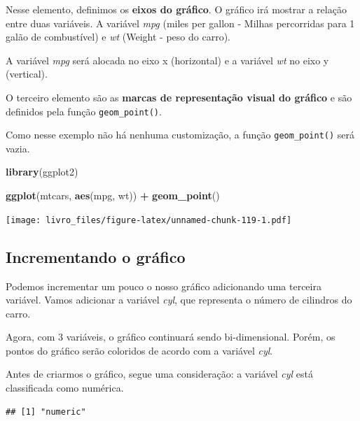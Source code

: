 \documentclass[
]{book}
\newenvironment{Shaded}{\begin{snugshade}}{\end{snugshade}}
\newcommand{\KeywordTok}[1]{\textcolor[rgb]{0.13,0.29,0.53}{\textbf{#1}}}
\newcommand{\NormalTok}[1]{#1}
\newcommand{\OperatorTok}[1]{\textcolor[rgb]{0.81,0.36,0.00}{\textbf{#1}}}
\newcommand{\StringTok}[1]{\textcolor[rgb]{0.31,0.60,0.02}{#1}}
\begin{document}
Nesse elemento, definimos os \textbf{eixos do gráfico}. O gráfico irá
mostrar a relação entre duas variáveis. A variável \emph{mpg} (miles per
gallon - Milhas percorridas para 1 galão de combustível) e \emph{wt}
(Weight - peso do carro).

A variável \emph{mpg} será alocada no eixo x (horizontal) e a variável
\emph{wt} no eixo y (vertical).

O terceiro elemento são as \textbf{marcas de representação visual do
gráfico} e são definidos pela função \texttt{geom\_point()}.

Como nesse exemplo não há nenhuma customização, a função
\texttt{geom\_point()} será vazia.

\begin{Shaded}
\begin{Highlighting}[]
\KeywordTok{library}\NormalTok{(ggplot2)}

\KeywordTok{ggplot}\NormalTok{(mtcars, }\KeywordTok{aes}\NormalTok{(mpg, wt)) }\OperatorTok{+}
\StringTok{  }\KeywordTok{geom_point}\NormalTok{()}
\end{Highlighting}
\end{Shaded}

\texttt{[image: livro\_files/figure-latex/unnamed-chunk-119-1.pdf]}

\hypertarget{incrementando-o-gruxe1fico}{%
\subsection{Incrementando o gráfico}\label{incrementando-o-gruxe1fico}}

Podemos incrementar um pouco o nosso gráfico adicionando uma terceira
variável. Vamos adicionar a variável \emph{cyl}, que representa o número
de cilindros do carro.

Agora, com 3 variáveis, o gráfico continuará sendo bi-dimensional.
Porém, os pontos do gráfico serão coloridos de acordo com a variável
\emph{cyl}.

Antes de criarmos o gráfico, segue uma consideração: a variável
\emph{cyl} está classificada como numérica.

\begin{Shaded}
\end{Shaded}

\begin{verbatim}
## [1] "numeric"
\end{verbatim}
\end{document}
